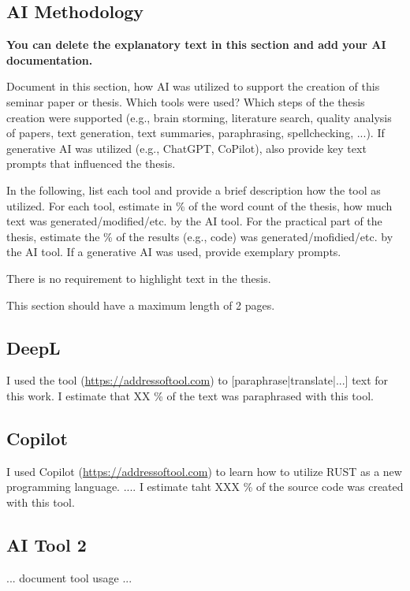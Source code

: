 \begin{appendices}


\section{AI Methodology}

\textbf{You can delete the explanatory text in this section and add your AI documentation.}

Document in this section, how AI was utilized to support the creation of this seminar paper or thesis. Which tools were used? Which steps of the thesis creation were supported (e.g., brain storming, literature search, quality analysis of papers, text generation, text summaries, paraphrasing, spellchecking, ...). If generative AI was utilized (e.g., ChatGPT, CoPilot), also provide key text prompts that influenced the thesis. 

In the following, list each tool and provide a brief description how the tool as utilized. For each tool, estimate in \% of the word count of the thesis, how much text was generated/modified/etc. by the AI tool. For the practical part of the thesis, estimate the \% of the results (e.g., code) was generated/mofidied/etc. by the AI tool. If a generative AI was used, provide exemplary prompts.

There is no requirement to highlight text in the thesis.

This section should have a maximum length of 2 pages.

\subsection{DeepL} %
I used the tool (\url{https://addressoftool.com}) to [paraphrase|translate|...] text for this work.  I estimate that XX \% of the text was paraphrased with this tool. 

\subsection{Copilot}
I used Copilot (\url{https://addressoftool.com}) to learn how to utilize RUST as a new programming language. .... 
I estimate taht XXX \% of the source code was created with this tool.

\subsection{AI Tool 2}
... document tool usage ...


\end{appendices}
